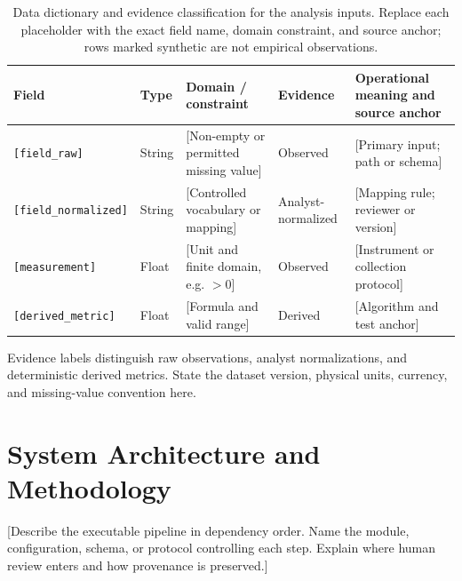 \documentclass[10pt,a4paper]{article}
\newcommand{\statusobserved}{Observed}
\newcommand{\statusderived}{Derived}
\begin{document}
\begin{table}[htbp]
  \centering
  \small
  \caption{Data dictionary and evidence classification for the analysis inputs.
    Replace each placeholder with the exact field name, domain constraint, and
  source anchor; rows marked synthetic are not empirical observations.}
  \label{tab:data-dictionary}
  \begin{threeparttable}
    \begin{tabularx}{\linewidth}{l l X l X}
      \toprule
      \textbf{Field} & \textbf{Type} & \textbf{Domain / constraint} &
      \textbf{Evidence} & \textbf{Operational meaning and source anchor} \\
      \midrule
      \texttt{[field\_raw]} & String & [Non-empty or permitted missing value] &
      \statusobserved & [Primary input; path or schema] \\
      \texttt{[field\_normalized]} & String & [Controlled vocabulary
      or mapping] &
      Analyst-normalized & [Mapping rule; reviewer or version] \\
      \texttt{[measurement]} & Float & [Unit and finite domain, e.g. $>0$] &
      \statusobserved & [Instrument or collection protocol] \\
      \texttt{[derived\_metric]} & Float & [Formula and valid range] &
      \statusderived & [Algorithm and test anchor] \\
      \bottomrule
    \end{tabularx}
    \begin{tablenotes}[flushleft]
      \footnotesize
    \item Evidence labels distinguish raw observations, analyst
      normalizations, and deterministic derived metrics. State the dataset
      version, physical units, currency, and missing-value convention here.
    \end{tablenotes}
  \end{threeparttable}
\end{table}

\section{System Architecture and Methodology}
[Describe the executable pipeline in dependency order. Name the module,
  configuration, schema, or protocol controlling each step. Explain where human
review enters and how provenance is preserved.]
\end{document}
